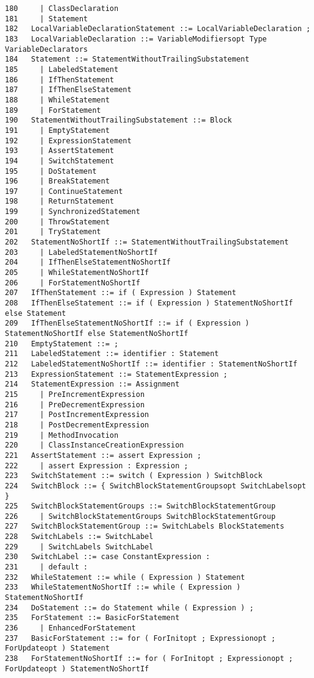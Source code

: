 \begin{verbatim}
180     | ClassDeclaration
181     | Statement
182   LocalVariableDeclarationStatement ::= LocalVariableDeclaration ;
183   LocalVariableDeclaration ::= VariableModifiersopt Type VariableDeclarators
184   Statement ::= StatementWithoutTrailingSubstatement
185     | LabeledStatement
186     | IfThenStatement
187     | IfThenElseStatement
188     | WhileStatement
189     | ForStatement
190   StatementWithoutTrailingSubstatement ::= Block
191     | EmptyStatement
192     | ExpressionStatement
193     | AssertStatement
194     | SwitchStatement
195     | DoStatement
196     | BreakStatement
197     | ContinueStatement
198     | ReturnStatement
199     | SynchronizedStatement
200     | ThrowStatement
201     | TryStatement
202   StatementNoShortIf ::= StatementWithoutTrailingSubstatement
203     | LabeledStatementNoShortIf
204     | IfThenElseStatementNoShortIf
205     | WhileStatementNoShortIf
206     | ForStatementNoShortIf
207   IfThenStatement ::= if ( Expression ) Statement
208   IfThenElseStatement ::= if ( Expression ) StatementNoShortIf else Statement
209   IfThenElseStatementNoShortIf ::= if ( Expression ) StatementNoShortIf else StatementNoShortIf
210   EmptyStatement ::= ;
211   LabeledStatement ::= identifier : Statement
212   LabeledStatementNoShortIf ::= identifier : StatementNoShortIf
213   ExpressionStatement ::= StatementExpression ;
214   StatementExpression ::= Assignment
215     | PreIncrementExpression
216     | PreDecrementExpression
217     | PostIncrementExpression
218     | PostDecrementExpression
219     | MethodInvocation
220     | ClassInstanceCreationExpression
221   AssertStatement ::= assert Expression ;
222     | assert Expression : Expression ;
223   SwitchStatement ::= switch ( Expression ) SwitchBlock
224   SwitchBlock ::= { SwitchBlockStatementGroupsopt SwitchLabelsopt }
225   SwitchBlockStatementGroups ::= SwitchBlockStatementGroup
226     | SwitchBlockStatementGroups SwitchBlockStatementGroup
227   SwitchBlockStatementGroup ::= SwitchLabels BlockStatements
228   SwitchLabels ::= SwitchLabel
229     | SwitchLabels SwitchLabel
230   SwitchLabel ::= case ConstantExpression :
231     | default :
232   WhileStatement ::= while ( Expression ) Statement
233   WhileStatementNoShortIf ::= while ( Expression ) StatementNoShortIf
234   DoStatement ::= do Statement while ( Expression ) ;
235   ForStatement ::= BasicForStatement
236     | EnhancedForStatement
237   BasicForStatement ::= for ( ForInitopt ; Expressionopt ; ForUpdateopt ) Statement
238   ForStatementNoShortIf ::= for ( ForInitopt ; Expressionopt ; ForUpdateopt ) StatementNoShortIf

\end{verbatim}
